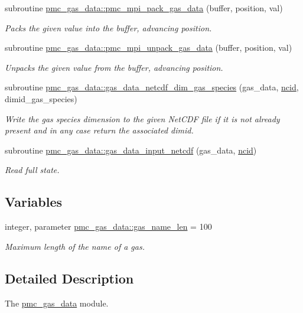 \begin{DoxyCompactItemize}
subroutine \mbox{\hyperlink{namespacepmc__gas__data_a50ae39f0438bbc196fc40825dde0385e}{pmc\+\_\+gas\+\_\+data\+::pmc\+\_\+mpi\+\_\+pack\+\_\+gas\+\_\+data}} (buffer, position, val)
\begin{DoxyCompactList}\small\item\em Packs the given value into the buffer, advancing position. \end{DoxyCompactList}\item 
subroutine \mbox{\hyperlink{namespacepmc__gas__data_af9c9ad522a84e72e20e052adad31c24d}{pmc\+\_\+gas\+\_\+data\+::pmc\+\_\+mpi\+\_\+unpack\+\_\+gas\+\_\+data}} (buffer, position, val)
\begin{DoxyCompactList}\small\item\em Unpacks the given value from the buffer, advancing position. \end{DoxyCompactList}\item 
subroutine \mbox{\hyperlink{namespacepmc__gas__data_a6df4c6edda1d1134595d124321b4f308}{pmc\+\_\+gas\+\_\+data\+::gas\+\_\+data\+\_\+netcdf\+\_\+dim\+\_\+gas\+\_\+species}} (gas\+\_\+data, \mbox{\hyperlink{fractal_8_f90_a4e89f3f850921ff84a6dfce8b166ad50}{ncid}}, dimid\+\_\+gas\+\_\+species)
\begin{DoxyCompactList}\small\item\em Write the gas species dimension to the given Net\+C\+DF file if it is not already present and in any case return the associated dimid. \end{DoxyCompactList}\item 
subroutine \mbox{\hyperlink{namespacepmc__gas__data_a1777fe2ed855a4b26c45287e166a0940}{pmc\+\_\+gas\+\_\+data\+::gas\+\_\+data\+\_\+input\+\_\+netcdf}} (gas\+\_\+data, \mbox{\hyperlink{fractal_8_f90_a4e89f3f850921ff84a6dfce8b166ad50}{ncid}})
\begin{DoxyCompactList}\small\item\em Read full state. \end{DoxyCompactList}\end{DoxyCompactItemize}
\subsection*{Variables}
\begin{DoxyCompactItemize}
\item 
integer, parameter \mbox{\hyperlink{namespacepmc__gas__data_a0d310b1185398e90f841bb9c3c83d3a9}{pmc\+\_\+gas\+\_\+data\+::gas\+\_\+name\+\_\+len}} = 100
\begin{DoxyCompactList}\small\item\em Maximum length of the name of a gas. \end{DoxyCompactList}\end{DoxyCompactItemize}


\subsection{Detailed Description}
The \mbox{\hyperlink{namespacepmc__gas__data}{pmc\+\_\+gas\+\_\+data}} module. 

